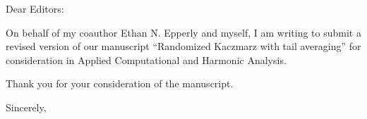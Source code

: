 \documentclass[mylettercfg2.tex,11pt]{ucsdletter}%
\begin{document}
\date{August 11, 2024}

\begin{letter}{Dear Editors:}

\opening{}

On behalf of my coauthor Ethan N. Epperly and myself, I am writing to submit a revised version of our manuscript ``Randomized Kaczmarz with tail averaging'' for consideration in Applied Computational and Harmonic Analysis.




Thank you for your consideration of the manuscript.

\closing{Sincerely,}

\end{letter}
\end{document}
